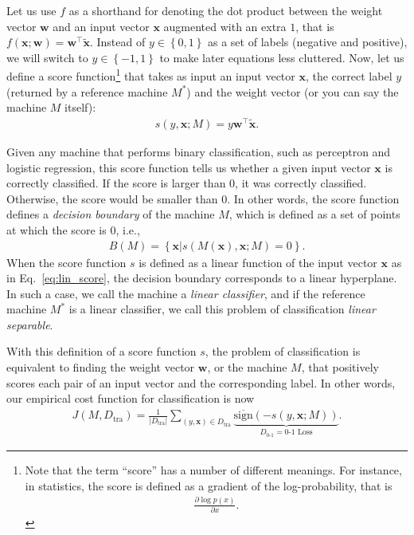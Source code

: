 \documentclass{report}
\newcommand{\vect}[1]{\mathbf{#1}}
\newcommand{\vx}[0]{\vect{x}}
\newcommand{\vw}[0]{\vect{w}}
\newcommand{\sign}{\text{sign}}
\begin{document}
Let us use $f$ as a shorthand for denoting the dot product between the weight
vector $\vw$ and an input vector $\vx$ augmented with an extra $1$, that is
$f(\vx; \vw) = \vw^\top \tilde{\vx}$. Instead of $y \in \left\{ 0, 1\right\}$ as
a set of labels (negative and positive), we will switch to $y \in \left\{ -1,
1\right\}$ to make later equations less cluttered. Now, let us define a score
function\footnote{
    Note that the term ``score'' has a number of different meanings. For
    instance, in statistics, the score is defined as a gradient of the
    log-probability, that is
    \begin{align*}
        \frac{\partial \log p(x)}{\partial x}.
    \end{align*}
} that takes as input an input vector $\vx$, the correct label $y$ (returned by
a reference machine $M^*$) and the weight vector (or you can say the machine $M$
itself): 
\begin{align}
    \label{eq:lin_score}
    s(y, \vx; M) = y \vw^\top \tilde{\vx}.
\end{align}

Given any machine that performs binary classification, such as perceptron and
logistic regression, this score function tells us whether a given input vector
$\vx$ is correctly classified. If the score is larger than 0, it was correctly
classified. Otherwise, the score would be smaller than 0. In other words, the
score function defines a {\it decision boundary} of the machine $M$, which is
defined as a set of points at which the score is $0$, i.e.,
\begin{align*}
    B(M) = \left\{ \vx | s(M(\vx), \vx; M) = 0 \right\}.
\end{align*}
When the score function $s$ is defined as a linear function of the input vector
$\vx$ as in Eq.~\eqref{eq:lin_score}, the decision boundary corresponds to a
linear hyperplane. In such a case, we call the machine a {\it linear
classifier}, and if the reference machine $M^*$ is a linear classifier, we call
this problem of classification {\it linear separable}.

With this definition of a score function $s$, the problem of classification is
equivalent to finding the weight vector $\vw$, or the machine $M$, that
positively scores each pair of an input vector and the corresponding label. In
other words, our empirical cost function for classification is now 
\begin{align}
    \label{eq:0-1_loss}
    J(M, D_{\text{tra}}) = \frac{1}{|D_{\text{tra}}|} \sum_{(y, \vx) \in D_{\text{tra}}} 
    \underbrace{\overline{\sign}(-s(y, \vx; M))}_{
        D_{\text{0-1}} = \text{0-1 Loss}
    }.
\end{align}
\end{document}
